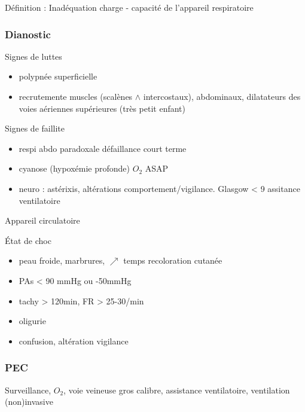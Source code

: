 \documentclass[11pt]{article}
\begin{document}
Définition : Inadéquation charge - capacité de l'appareil respiratoire

\subsubsection{Dianostic}
\label{sec:orge4628ec}
Signes de luttes

\begin{itemize}
\item polypnée superficielle
\item recrutemente muscles (scalènes \(\wedge\) intercostaux), abdominaux,
dilatateurs des voies aériennes supérieures (très petit enfant)
\end{itemize}

Signes de faillite

\begin{itemize}
\item respi abdo paradoxale \faBomb{} défaillance court terme
\item cyanose (hypoxémie profonde) \thus \(O_2\) ASAP
\item neuro : astérixis, altérations comportement/vigilance. Glasgow < 9
\thus assitance ventilatoire
\end{itemize}

Appareil circulatoire


État de choc 

\begin{itemize}
\item peau froide, marbrures, \(\nearrow\) temps recoloration cutanée
\item PAs < 90 mmHg ou -50mmHg
\item tachy > 120min, FR > 25-30/min
\item oligurie
\item confusion, altération vigilance
\end{itemize}


\subsubsection{PEC}
\label{sec:orgd0bfe23}
Surveillance, \(O_2\), voie veineuse gros calibre, assistance ventilatoire,
ventilation (non)invasive
\end{document}
